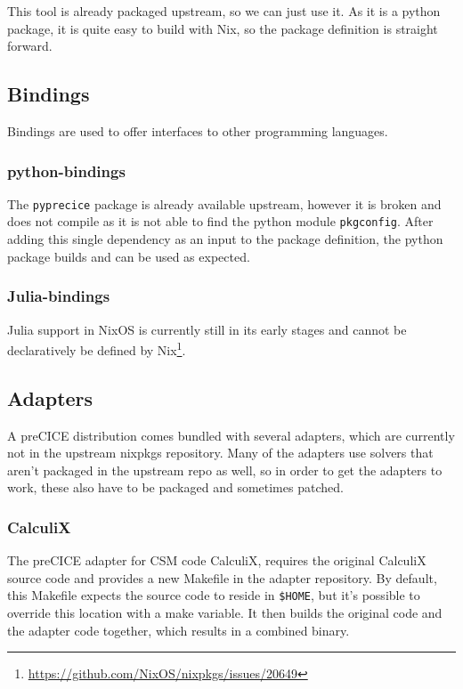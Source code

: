 \documentclass[conference,final,a4paper]{IEEEtran}
\begin{document}
This tool is already packaged upstream, so we can just use it.
As it is a python package, it is quite easy to build with Nix, so the package definition is straight forward.

\subsection{Bindings}

Bindings are used to offer interfaces to other programming languages.

\subsubsection{python-bindings}

The \texttt{pyprecice} package is already available upstream, however it is broken and does not compile as it is not able to find the python module \texttt{pkgconfig}.
After adding this single dependency as an input to the package definition, the python package builds and can be used as expected.

\subsubsection{Julia-bindings}

Julia support in NixOS is currently still in its early stages and cannot be declaratively be defined by Nix\footnote{\url{https://github.com/NixOS/nixpkgs/issues/20649}}.

\subsection{Adapters}

A preCICE distribution comes bundled with several adapters, which are currently not in the upstream nixpkgs repository.
Many of the adapters use solvers that aren't packaged in the upstream repo as well, so in order to get the adapters to work, these also have to be packaged and sometimes patched.\\

\subsubsection{CalculiX}

The preCICE adapter for CSM code CalculiX, requires the original CalculiX source code and provides a new Makefile in the adapter repository.
By default, this Makefile expects the source code to reside in \texttt{\$HOME}, but it's possible to override this location with a make variable.
It then builds the original code and the adapter code together, which results in a combined binary.
\end{document}
